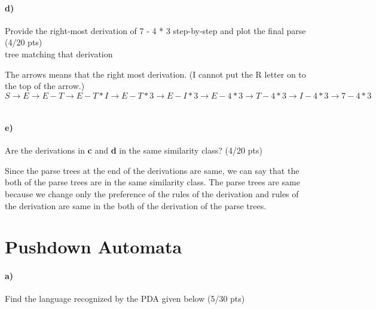 \documentclass[a4paper,12pt]{article}
\begin{document}
\paragraph{d)} Provide the right-most derivation of 7 - 4 * 3 step-by-step and plot the final parse \hfill \small{(4/20 pts)} \\
 tree matching that derivation \\
 
\begin{tcolorbox}
The arrows means that the right most derivation. (I cannot put the R letter on to the top of the arrow.) \\
\vspace{2cm}
$S \rightarrow E\rightarrow E-T\rightarrow E - T*I\rightarrow E-T*3 \rightarrow E - I*3 \rightarrow E- 4*3\rightarrow T - 4*3\rightarrow I-4*3 \rightarrow7-4*3$\\\\

\end{tcolorbox}


\paragraph{e)} Are the derivations in \textbf{c} and \textbf{d} in the same similarity class?  \hfill \small{(4/20 pts)} \\

\begin{tcolorbox}
Since the parse trees at the end of the derivations are same, we can say that the both of the parse trees are in the same similarity class. The parse trees are same because we change only the preference of the rules of the derivation and rules of the derivation are same in the both of the derivation of the parse trees.	
\end{tcolorbox}


\newpage
\section{Pushdown Automata \hfill {}}

\paragraph{a)} 
Find the language recognized by the PDA given below \hfill \small{(5/30 pts)} \\
\end{document}
